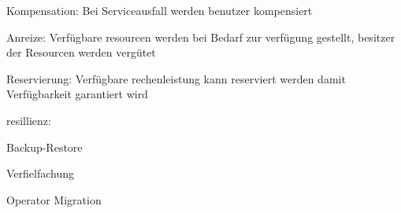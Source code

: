 \begin{notes}
\begin{notes}
\begin{notes}
            \begin{notes}
                \item Kompensation: Bei Serviceausfall werden benutzer kompensiert
                \item Anreize: Verfügbare resourcen werden bei Bedarf zur verfügung gestellt, besitzer der Resourcen werden vergütet
                \item Reservierung: Verfügbare rechenleistung kann reserviert werden damit Verfügbarkeit garantiert wird
            \end{notes}
            \item resillienz:
            \begin{notes}
                \item Backup-Restore
                \item Verfielfachung
                \item Operator Migration
            \end{notes}
        \end{notes}
    \end{notes}
   
\end{notes} 

